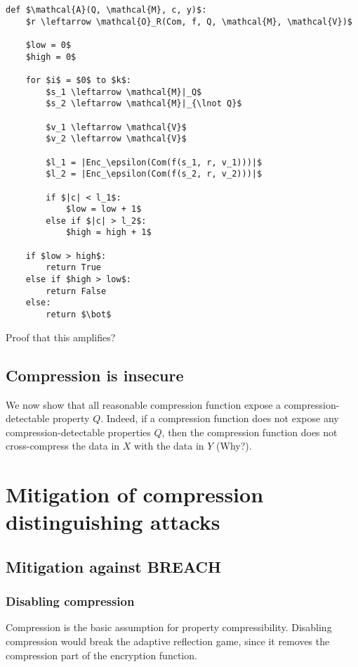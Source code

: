 \documentclass{article}
\begin{document}
\begin{lstlisting}[texcl,mathescape]
def $\mathcal{A}(Q, \mathcal{M}, c, y)$:
    $r \leftarrow \mathcal{O}_R(Com, f, Q, \mathcal{M}, \mathcal{V})$

    $low = 0$
    $high = 0$

    for $i$ = $0$ to $k$:
        $s_1 \leftarrow \mathcal{M}|_Q$
        $s_2 \leftarrow \mathcal{M}|_{\lnot Q}$

        $v_1 \leftarrow \mathcal{V}$
        $v_2 \leftarrow \mathcal{V}$

        $l_1 = |Enc_\epsilon(Com(f(s_1, r, v_1)))|$
        $l_2 = |Enc_\epsilon(Com(f(s_2, r, v_2)))|$

        if $|c| < l_1$:
            $low = low + 1$
        else if $|c| > l_2$:
            $high = high + 1$

    if $low > high$:
        return True
    else if $high > low$:
        return False
    else:
        return $\bot$
\end{lstlisting}

Proof that this amplifies?

\subsection{Compression is insecure}

We now show that all reasonable compression function expose a compression-detectable property $Q$. Indeed, if a compression function does not expose any compression-detectable properties $Q$, then the compression function does not cross-compress the data in $X$ with the data in $Y$ (Why?).

\section{Mitigation of compression distinguishing attacks}

\subsection{Mitigation against BREACH}

\subsubsection{Disabling compression}
Compression is the basic assumption for property compressibility. Disabling
compression would break the adaptive reflection game, since it removes
the compression part of the encryption function.
\end{document}
